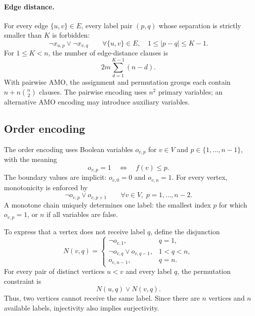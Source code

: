 \paragraph{Edge distance.}
For every edge $\{u,v\}\in E$, every label pair $(p,q)$ whose separation is
strictly smaller than $K$ is forbidden:
\begin{equation}
  \neg x_{u,p}\vee\neg x_{v,q}
  \qquad
  \forall\{u,v\}\in E,\quad
  1\leq |p-q|\leq K-1.
  \label{eq:pairwise-distance}
\end{equation}
For $1\leq K<n$, the number of edge-distance clauses is
\begin{equation}
  2m\sum_{d=1}^{K-1}(n-d).
\end{equation}
With pairwise AMO, the assignment and permutation groups each contain
$n+n\binom{n}{2}$ clauses. The pairwise encoding uses $n^2$ primary variables;
an alternative AMO encoding may introduce auxiliary variables.

\subsection{Order encoding}
The order encoding uses Boolean variables $o_{v,p}$ for
$v\in V$ and $p\in\{1,\ldots,n-1\}$, with the meaning
\begin{equation}
  o_{v,p}=1 \quad\Longleftrightarrow\quad f(v)\leq p.
  \label{eq:order-variable}
\end{equation}
The boundary values are implicit: $o_{v,0}=0$ and $o_{v,n}=1$. For every
vertex, monotonicity is enforced by
\begin{equation}
  \neg o_{v,p}\vee o_{v,p+1}
  \qquad
  \forall v\in V,\;p=1,\ldots,n-2.
  \label{eq:order-chain}
\end{equation}
A monotone chain uniquely determines one label: the smallest index $p$ for
which $o_{v,p}=1$, or $n$ if all variables are false.

To express that a vertex does not receive label $q$, define the disjunction
\begin{equation}
  N(v,q)=
  \begin{cases}
    \neg o_{v,1}, & q=1,\\
    \neg o_{v,q}\vee o_{v,q-1}, & 1<q<n,\\
    o_{v,n-1}, & q=n.
  \end{cases}
  \label{eq:not-label}
\end{equation}
For every pair of distinct vertices $u<v$ and every label $q$, the
permutation constraint is
\begin{equation}
  N(u,q)\vee N(v,q).
  \label{eq:order-permutation}
\end{equation}
Thus, two vertices cannot receive the same label. Since there are $n$ vertices
and $n$ available labels, injectivity also implies surjectivity.

